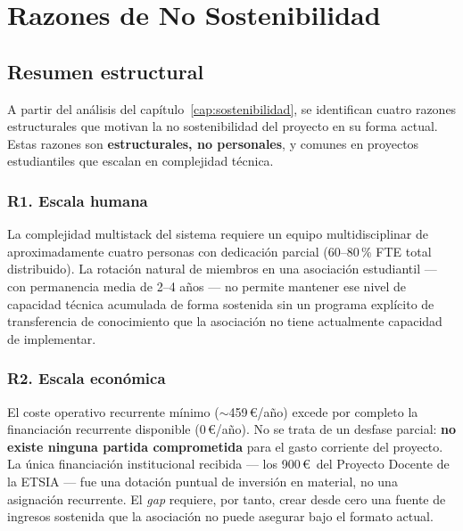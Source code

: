 \chapter{Razones de No Sostenibilidad}
\label{cap:razones}

\section{Resumen estructural}

A partir del an\'alisis del cap\'itulo~\ref{cap:sostenibilidad}, se
identifican cuatro razones estructurales que motivan la no
sostenibilidad del proyecto en su forma actual. Estas razones son
\textbf{estructurales, no personales}, y comunes en proyectos
estudiantiles que escalan en complejidad t\'ecnica.

\subsection*{R1. Escala humana}

La complejidad multistack del sistema requiere un equipo
multidisciplinar de aproximadamente cuatro personas con dedicaci\'on
parcial (60--80\,\% FTE total distribuido). La rotaci\'on natural de
miembros en una asociaci\'on estudiantil --- con permanencia media de
2--4 a\~nos --- no permite mantener ese nivel de capacidad t\'ecnica
acumulada de forma sostenida sin un programa expl\'icito de transferencia
de conocimiento que la asociaci\'on no tiene actualmente capacidad de
implementar.

\subsection*{R2. Escala econ\'omica}

El coste operativo recurrente m\'inimo
($\sim$459\,\euro/a\~no) excede por completo la financiaci\'on
recurrente disponible (0\,\euro/a\~no). No se trata de un desfase
parcial: \textbf{no existe ninguna partida comprometida} para el gasto
corriente del proyecto. La \'unica financiaci\'on institucional recibida
--- los 900\,\euro\ del Proyecto Docente de la ETSIA --- fue una
dotaci\'on puntual de inversi\'on en material, no una asignaci\'on
recurrente. El \textit{gap} requiere, por tanto, crear desde cero una
fuente de ingresos sostenida que la asociaci\'on no puede asegurar bajo
el formato actual.

